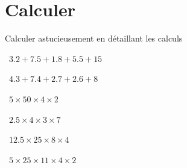 
\section{Calculer}

Calculer astucieusement en détaillant les calculs
\begin{questions}
	
	
	
	\question[2]  $\num{3.2} + \num{7.5} + \num{1.8} + \num{5.5} + 15 $
	\fillwithdottedlines{2cm}
	\begin{solution}
		
	\end{solution}
	
	\question[2]  $\num{4.3} + \num{7.4} + \num{2.7} + \num{2.6} + 8 $
	\fillwithdottedlines{2cm}
	\begin{solution}
		
	\end{solution}
	

	
	\question[2]  $\num{5} \times 50  \times \num{4} \times 2$
	\fillwithdottedlines{2cm}
	\begin{solution}
		
	\end{solution}	

	

	

	\question[2]  $\num{2.5} \times 4 \times 3 \times 7$
	\fillwithdottedlines{2cm}
	\begin{solution}
		
	\end{solution}

	\newpage
	
		
	\question[2]  $\num{12.5} \times 25 \times \num{8} \times 4$
	\fillwithdottedlines{2cm}
	\begin{solution}
		
	\end{solution}

	
	\question[2]  $\num{5} \times 25 \times 11 \times \num{4} \times 2$
	\fillwithdottedlines{2cm}
	\begin{solution}
		
	\end{solution}	
	


\end{questions}

